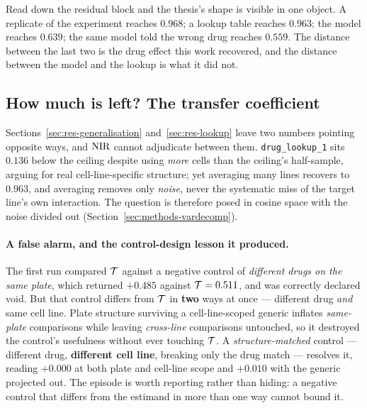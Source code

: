 Read down the residual block and the thesis's shape is visible in one object. A replicate of the
experiment reaches $0.968$; a lookup table reaches $0.963$; the model reaches $0.639$; the same model
told the wrong drug reaches $0.559$. The distance between the last two is the drug effect this work
recovered, and the distance between the model and the lookup is what it did not.

\subsection{How much is left? The transfer coefficient}
\label{sec:res-transfer}

Sections~\ref{sec:res-generalisation} and~\ref{sec:res-lookup} leave two numbers pointing opposite
ways, and $\textrm{NIR}$ cannot adjudicate between them. \texttt{drug\_lookup\_1} sits $0.136$ below the
ceiling despite using \emph{more} cells than the ceiling's half-sample, arguing for real
cell-line-specific structure; yet averaging many lines recovers to $0.963$, and averaging removes only
\emph{noise}, never the systematic miss of the target line's own interaction. The question is
therefore posed in cosine space with the noise divided out (Section~\ref{sec:methods-vardecomp}).

\paragraph{A false alarm, and the control-design lesson it produced.} The first run compared
$\mathcal{T}$ against a negative control of \emph{different drugs on the same plate}, which returned
$+0.485$ against $\mathcal{T} = 0.511$, and was correctly declared void. But that control differs from
$\mathcal{T}$ in \textbf{two} ways at once --- different drug \emph{and} same cell line. Plate structure
surviving a cell-line-scoped generic inflates \emph{same-plate} comparisons while leaving
\emph{cross-line} comparisons untouched, so it destroyed the control's usefulness without ever
touching $\mathcal{T}$. A \emph{structure-matched} control --- different drug, \textbf{different cell
line}, breaking only the drug match --- resolves it, reading $+0.000$ at both plate and cell-line scope and $+0.010$ with the generic projected out. The
episode is worth reporting rather than hiding: a negative control that differs from the estimand in
more than one way cannot bound it.

